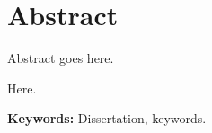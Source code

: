 \chapter*{Abstract}
\thispagestyle{addin}

Abstract goes here.

Here.


\par
\textbf{Keywords:} Dissertation, keywords.
\newpage
